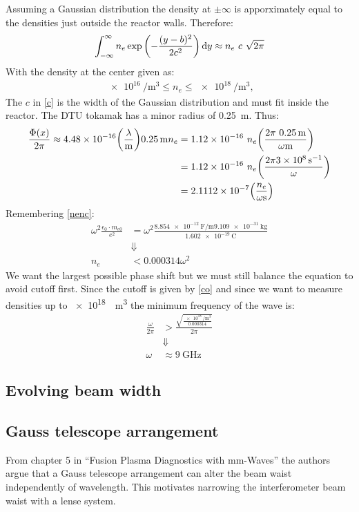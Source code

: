 Assuming a Gaussian distribution the density at \(\pm\infty\) is apporximately equal to the densities just outside the reactor walls. Therefore:
\begin{align}
  \int_{-\infty}^{\infty}n_e \exp\pqty{-\frac{(y-b)^2}{2c^2}}\dd{y} \approx n_e\ c\ \sqrt{2\pi}\label{c}
\end{align}
With the density at the center given as:
\begin{align}
  \SI{e16}{\per\meter\cubed} \leq n_e \leq \SI{e18}{\per\meter\cubed},
\end{align}
The \(c\) in \cref{c} is the width of the Gaussian distribution and must fit inside the reactor. The DTU tokamak has a minor radius of \SI{0.25}{\meter}. Thus:
\begin{align}
  \frac{\Phi(x)}{2\pi} \approx 4.48\times 10^{-16}\pqty{\frac{\lambda}{\si{\meter}}}\SI{0.25}{\meter}n_e &= 1.12\times 10^{-16}\ n_e \pqty{\frac{2\pi\ \SI{0.25}{\meter}}{\omega\si{\meter}}}\\
  &= 1.12\times 10^{-16}\ n_e\pqty{\frac{2\pi\SI{3e8}{\per\second}}{\omega}} \\
  &= 2.1112\times 10^{-7}\pqty{\frac{n_e}{\omega\si{\second}}}
\end{align}
Remembering \cref{nenc}:
\begin{align}
  \omega^2\frac{\epsilon_0\cdot m_{e0}}{e^2} &= \omega^2\frac{\SI{8.854e-12}{\farad\per\meter}\SI{9.109e-31}{\kilo\gram}}{\SI{1.602e-19}{\coulomb}}\\
  &\Downarrow\nonumber\\
  n_e &< 0.000314\omega^2 \label{co}
\end{align}
We want the largest possible phase shift but we must still balance the equation to avoid cutoff first.
Since the cutoff is given by \cref{co} and since we want to measure densities up to \SI{e18}{\per\meter\cubed} the minimum frequency of the wave is:
\begin{align}
  \frac{\omega}{2\pi} &> \frac{\sqrt{\frac{\SI{e18}{\per\meter\cubed}}{0.000314}}}{2\pi}\\
  &\Downarrow\nonumber\\
  \omega &\approx \SI{9}{\giga\hertz}
\end{align}

\subsection{Evolving beam width}

\subsection{Gauss telescope arrangement}
From chapter 5 in ``Fusion Plasma Diagnostics with mm-Waves''\cite{PlasmaDiagnosis} the authors argue that a Gauss telescope arrangement can alter the beam waist independently of wavelength. This motivates narrowing the interferometer beam waist with a lense system.
